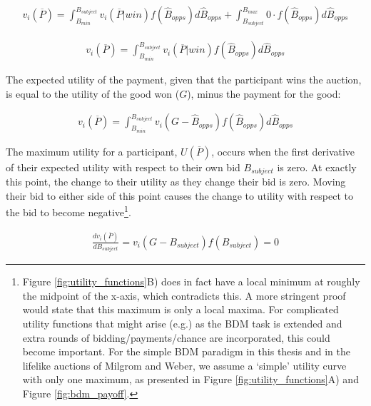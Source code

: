 \begin{equation}
\begin{aligned}
v_i(\overline{P}) = \int_{B_{min}}^{B_{subject}} v_i(\overline{P}|win)f(\hat{B}_{opps})d\hat{B}_{opps} + \int_{B_{subject}}^{B_{max}} 0 \cdot f(\hat{B}_{opps})d\hat{B}_{opps}
\end{aligned}
\label{eq:bdm_ic3}
\end{equation}

\begin{equation}
\begin{aligned}
v_i(\overline{P}) = \int_{B_{min}}^{B_{subject}} v_i(\overline{P}|win)f(\hat{B}_{opps})d\hat{B}_{opps}
\end{aligned}
\label{eq:bdm_ic4}
\end{equation}

The expected utility of the payment, given that the participant wins the auction, is equal to the utility of the good won ($G$), minus the payment for the good:

\begin{equation}
\begin{aligned}
v_i(\overline{P}) = \int_{B_{min}}^{B_{subject}} v_i(G - \hat{B}_{opps})f(\hat{B}_{opps})d\hat{B}_{opps}
\end{aligned}
\label{eq:bdm_ic5}
\end{equation}

The maximum utility for a participant, $U(\overline{P})$, occurs when the first derivative of their expected utility with respect to their own bid $B_{subject}$ is zero. At exactly this point, the change to their utility as they change their bid is zero. Moving their bid to either side of this point causes the change to utility with respect to the bid to become negative\footnote{Figure \ref{fig:utility_functions}B) does in fact have a local minimum at roughly the midpoint of the x-axis, which contradicts this. A more stringent proof would state that this maximum is only a local maxima. For complicated utility functions that might arise (e.g.) as the BDM task is extended and extra rounds of bidding/payments/chance are incorporated, this could become important. For the simple BDM paradigm in this thesis and in the lifelike auctions of Milgrom and Weber, we assume a ‘simple’ utility curve with only one maximum, as presented in Figure \ref{fig:utility_functions}A) and Figure \ref{fig:bdm_payoff}.}.

\begin{equation}
\begin{aligned}
\frac{dv_i(\overline{P})}{dB_{subject}} = v_i(G - B_{subject})f(B_{subject}) = 0
\end{aligned}
\label{eq:placeholder}
\end{equation}

